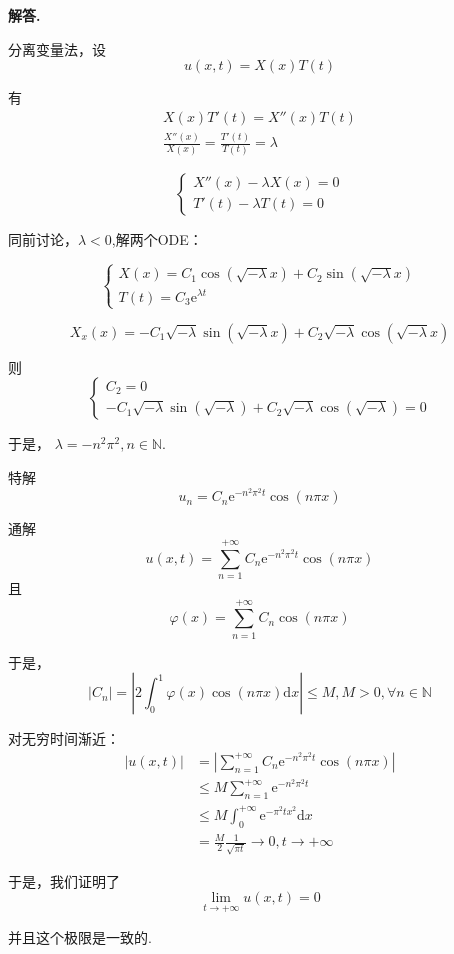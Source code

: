 \documentclass[12pt, a4paper, oneside]{ctexart}
\newenvironment{solution}{\par\noindent\textbf{解答. }}{\par}
\begin{document}
\begin{solution}
  \par
分离变量法，设
$$
u(x,t)=X(x)T(t)
$$
\par
有
$$
\begin{aligned}
X(x)T'(t)=X''(x)T(t)\\
\frac{X''(x)}{X(x)}=\frac{T'(t)}{T(t)}=\lambda
\end{aligned}
$$
\par
$$
\begin{cases}
  X''(x)-\lambda X(x)=0\\
  T'(t)-\lambda T(t)=0
\end{cases}
$$
\par
同前讨论，$\lambda<0$,解两个ODE：

$$
\begin{cases}
  X(x)=C_1\cos (\sqrt{-\lambda}x)+C_2\sin (\sqrt{-\lambda}x)\\
  T(t)=C_3\mathrm{e}^{\lambda t}
\end{cases}
$$

$$
X_x(x)=-C_1\sqrt{-\lambda}\sin (\sqrt{-\lambda}x)+C_2\sqrt{-\lambda}\cos (\sqrt{-\lambda}x)
$$
\par
则
$$
\begin{cases}
C_2=0\\
-C_1\sqrt{-\lambda}\sin (\sqrt{-\lambda})+C_2\sqrt{-\lambda}\cos (\sqrt{-\lambda})=0
\end{cases}
$$
\par
于是，
$\lambda=-n^2\pi^2, n \in \mathbb{N}$.
\par
特解
$$
u_n=C_n\mathrm{e}^{-n^2\pi^2t}\cos(n\pi x)
$$
\par
通解
$$
u(x,t)=\sum_{n=1}^{+\infty}C_n\mathrm{e}^{-n^2\pi^2t}\cos(n\pi x)
$$
且
$$
\varphi(x)=\sum_{n=1}^{+\infty}C_n\cos (n\pi x)
$$
\par
于是，
$$
|C_n|=\left|2\int_{0}^{1}\varphi(x)\cos(n\pi x)\mathrm{d}x\right| \leqslant M, M>0,
\forall n \in \mathbb{N}
$$

\par
对无穷时间渐近：
$$
\begin{aligned}
|u(x,t)|
&=\left|\sum_{n=1}^{+\infty}C_n\mathrm{e}^{-n^2\pi^2t}\cos(n\pi x)\right|\\
&\leqslant M\sum_{n=1}^{+\infty}\mathrm{e}^{-n^2\pi^2t}\\
&\leqslant M\int_{0}^{+\infty}\mathrm{e}^{-\pi^2 tx^2}\mathrm{d}x\\
&=\frac{M}{2}\frac{1}{\sqrt{\pi t}}\to 0, t \to +\infty
\end{aligned}
$$
\par
于是，我们证明了
$$
\lim_{t \to +\infty}u(x,t)=0
$$
\par
并且这个极限是一致的.
\end{solution}
\end{document}
